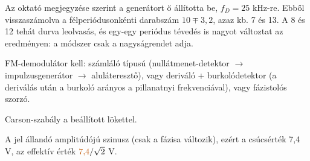 Az oktató megjegyzése szerint a generátort ő állította be, $f_D=25$ kHz-re. Ebből visszaszámolva a félperiódusonkénti darabszám $10\mp3{,}2$, azaz kb. 7 és 13. A 8 és 12 tehát durva leolvasás, és egy-egy periódus tévedés is nagyot változtat az eredményen: a módszer csak a nagyságrendet adja.

\begin{center}\end{center}

\begin{center}\end{center}

FM-demodulátor kell: számláló típusú (nullátmenet-detektor $\to$ impulzusgenerátor $\to$ aluláteresztő), vagy deriváló + burkolódetektor (a deriválás után a burkoló arányos a pillanatnyi frekvenciával), vagy fázistolós szorzó.

Carson-szabály a beállított lökettel.

\begin{center}\end{center}

A jel állandó amplitúdójú szinusz (csak a fázisa változik), ezért a csúcsérték 7,4 V, az effektív érték ${\cb{7{,}4}}/\sqrt2$ V.

\begin{center}\end{center}

